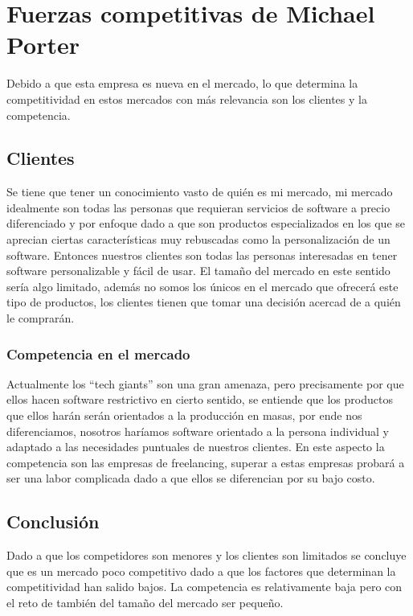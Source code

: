 \documentclass{article}
\begin{document}
\section{Fuerzas competitivas de Michael Porter}
Debido a que esta empresa es nueva en el mercado, lo que determina la competitividad en estos mercados con más relevancia son los clientes y la competencia.




\subsection{Clientes}
Se tiene que tener un conocimiento vasto de quién es mi mercado, mi mercado idealmente son todas las personas que requieran servicios de software a precio diferenciado y por enfoque dado a que son productos especializados en los que se aprecian ciertas características muy rebuscadas como la personalización de un software. Entonces nuestros clientes son todas las personas interesadas en tener software personalizable y fácil de usar. El tamaño del mercado en este sentido sería algo limitado, además no somos los únicos en el mercado que ofrecerá este tipo de productos, los clientes tienen que tomar una decisión acercad de a quién le comprarán.


\subsubsection{Competencia en el mercado}
Actualmente los ``tech giants'' son una gran amenaza, pero precisamente por que ellos hacen software restrictivo en cierto sentido, se entiende que los productos que ellos harán serán orientados a la producción en masas, por ende nos diferenciamos, nosotros haríamos software orientado a la persona individual y adaptado a las necesidades puntuales de nuestros clientes. En este aspecto la competencia son las empresas de freelancing, superar a estas empresas probará a ser una labor complicada dado a que ellos se diferencian por su bajo costo. 


\subsection{Conclusión}
Dado a que los competidores son menores y los clientes son limitados se concluye que es un mercado poco competitivo dado a que los factores que determinan la competitividad han salido bajos. La competencia es relativamente baja pero con el reto de también del tamaño del mercado ser pequeño.
\end{document}
